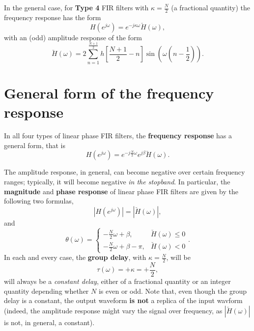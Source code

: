 \documentclass[\documentfontsize, twocolumn]{\classname}
\begin{document}
In the general case, for \textbf{Type 4} FIR filters with $\kappa = \frac N 2$ (a fractional quantity) the frequency response has the form
\begin{equation}\label{eqn:linearPhaseTypeIVResponse}
    H(e^{j\omega}) = e^{-j\kappa\omega}\breve{H}(\omega),
\end{equation}
with an (odd) amplitude response of the form
\begin{equation}\label{eqn:linearPhaseTypeIVAmplitudeResponse}
    \breve{H}(\omega) = 2\sum_{n=1}^{\frac{N+1}{2}} h[\frac{N+1}{2} - n]\sin{(\omega (n - \frac 1 2))}.
\end{equation}


\section{General form of the frequency response}
In all four types of linear phase FIR filters, the \textbf{frequency response} has a general form, that is
\begin{equation}\label{eqn:linearPhaseGeneralResponse}
    H(e^{j\omega}) = e^{-j\frac N 2 \omega}e^{j\beta}\breve{H}(\omega).
\end{equation}

The amplitude response, in general, can become negative over certain frequency ranges; typically, it will become negative \emph{in the stopband}. In particular, the \textbf{magnitude} and \textbf{phase response} of linear phase FIR filters are given by the following two formulas,
\begin{equation}\label{eqn:linearPhaseGeneralMagnitudeResponse}
    \left|H(e^{j\omega})\right| = \left|\breve{H}(\omega)\right|,
\end{equation}
and
\begin{equation}\label{eqn:linearPhaseGeneralPhaseResponse}
    \theta(\omega) = 
    \left\{
        \begin{array}{ll}
            -\frac N 2 \omega + \beta, & \breve{H}(\omega) \leq 0\\
            -\frac N 2 \omega + \beta - \pi, & \breve{H}(\omega) < 0
        \end{array}
    \right..
\end{equation}
In each and every case, the \textbf{group delay}, with $\kappa = \frac N 2$, will be
\begin{equation}\label{eqn:linearPhaseGeneralGroupDelay}
    \tau(\omega) = +\kappa = +\frac N 2,
\end{equation}
will always be a \emph{constant delay}, either of a fractional quantity or an integer quantity depending whether $N$ is even or odd. Note that, even though the group delay is a constant, the output waveform \textbf{is not} a replica of the input wavform (indeed, the amplitude response might vary the signal over frequency, as $\left|\breve{H}(\omega)\right|$ is not, in general, a constant).
\end{document}
